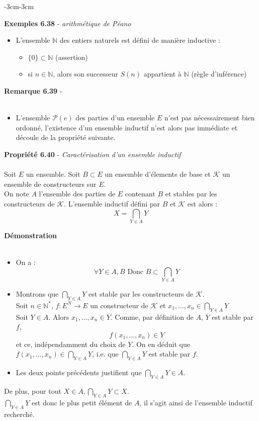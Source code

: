 \documentclass{article}
\newenvironment{exemples}[2]
{
    \begin{boite_exemples}
    \textbf{\textcolor{bleu_fonce}{Exemples #1}} - \textit{#2} \\
    \begin{itemize}[label=$\blacktriangleright \quad $]                    
}
{   
    \end{itemize}
    \end{boite_exemples}
    \vspace{15pt}
}
\newenvironment{proposition}[2]
{
    \begin{boite_proposition}
    \textbf{\textcolor{rouge_fonce}{Propriété #1}} - \textit{#2} \\ \\
}
{
    \end{boite_proposition}
    \vspace{15pt}
}
\newenvironment{demonstration}
{
    \begin{boite_demonstration}
    \textbf{\textcolor{rouge_fonce}{Démonstration}}\\ \\
}
{
    \end{boite_demonstration}
    \vspace{15pt}
}
\newenvironment{remarque}[2]
{
    \begin{boite_remarque}
    \textbf{\textcolor{bleu_fonce}{Remarque #1}} - \textit{#2} \\ \\
    \begin{itemize}[label=$\blacktriangleright \quad $ ]                    
}
{   
    \end{itemize}
    \end{boite_remarque}
    
}
\begin{document}
\begin{adjustwidth}{-3cm}{-3cm}
        \begin{exemples}{6.38}{arithmétique de Péano}
            \item L'ensemble $\mathbb{N}$ des entiers naturels est défini de manière inductive :\begin{itemize}
                \item $\{0\} \subset \mathbb{N}$ (assertion)
                \item si $n \in \mathbb{N}$, alors son successeur $S(n)$ appartient à $\mathbb{N}$ (règle d'inférence)
            \end{itemize}
        \end{exemples}

        \begin{remarque}{6.39}{}
            \item L'ensemble $\mathcal{P}(e)$ des parties d'un ensemble $E$ n'est pas nécessairement bien ordonné, l'existence d'un ensemble inductif n'est alors pas immédiate et découle de la propriété suivante.       
        \end{remarque}

        \begin{proposition}{6.40}{Caractérisation d'un ensemble inductif}
            Soit $E$ un ensemble. Soit $B \subset E$ un ensemble d'élements de base et $\mathcal{K}$ un ensemble de constructeurs sur $E$. \\ On note $A$ l'ensemble des parties de $E$ contenant $B$ et stables par les constructeurs de $\mathcal{K}$. L'ensemble inductif défini par $B$ et $\mathcal{K}$ est alors : $$X = \bigcap_{Y \in A}Y$$
        \end{proposition}

        \begin{demonstration}
            \begin{itemize}
                \item On a : $$\forall Y \in A, B \text{ Donc } B \subset \bigcap_{Y \in A} Y$$ 
                \item Montrons que $\bigcap_{Y \in A} Y$ est stable par les constructeurs de $\mathcal{K}$. \\ Soit $n \in \mathbb{N}^*$, $f:E^N \rightarrow E$ un constructeur de $\mathcal{K}$ et $x_1, \ldots, x_n \in \bigcap_{Y \in A} Y$ \\ Soit $Y \in A$. Alors $x_1, \ldots, x_n \in Y$. Comme, par définition de $A$, $Y$ est stable par $f$, $$f(x_1, \ldots, x_n) \in Y$$ et ce, indépendamment du choix de $Y$. On en déduit que $f(x_1, \ldots, x_n) \in \bigcap_{Y \in A} Y$, i.e. que $\bigcap_{Y \in A} Y$ est stable par $f$. 
                \item Les deux points précédents justifient que $\bigcap_{Y \in A} Y \in A$.
            \end{itemize}
            De plus, pour tout $X \in A, \bigcap_{Y \in A} Y \subset X$. \\ $\bigcap_{Y \in A} Y$ est donc le plus petit élément de $A$, il s'agit ainsi de l'ensemble inductif recherché.
        \end{demonstration}


\end{adjustwidth}
\end{document}
